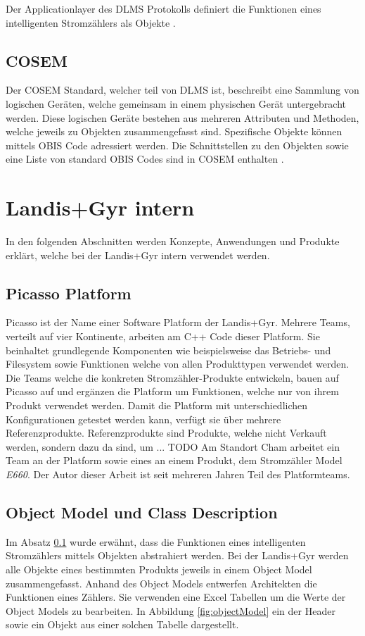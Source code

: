 Der Applicationlayer des \ac{DLMS} Protokolls definiert die Funktionen eines intelligenten Stromzählers als Objekte \parencite{vyas2012advance}.

\subsection{COSEM}\label{cosem}
Der \ac{COSEM} Standard, welcher teil von \ac{DLMS} ist, beschreibt eine Sammlung von logischen Geräten, welche gemeinsam in einem physischen Gerät untergebracht werden.
Diese logischen Geräte bestehen aus mehreren Attributen und Methoden, welche jeweils zu Objekten zusammengefasst sind.
Spezifische Objekte können mittels \ac{OBIS} Code adressiert werden.
Die Schnittstellen zu den Objekten sowie eine Liste von standard \ac{OBIS} Codes sind in \ac{COSEM} enthalten  \parencite{vyas2012advance}.


\section{Landis+Gyr intern}\label{lgintern}
In den folgenden Abschnitten werden Konzepte, Anwendungen und Produkte erklärt, welche bei der Landis+Gyr intern verwendet werden.

\subsection{Picasso Platform}\label{picasso}
Picasso ist der Name einer Software Platform der Landis+Gyr.
Mehrere Teams, verteilt auf vier Kontinente, arbeiten am C++ Code dieser Platform.
Sie beinhaltet grundlegende Komponenten wie beispielsweise das Betriebs- und Filesystem sowie Funktionen welche von allen Produkttypen verwendet werden.
Die Teams welche die konkreten Stromzähler-Produkte entwickeln, bauen auf Picasso auf und ergänzen die Platform um Funktionen, welche nur von ihrem Produkt verwendet werden.
Damit die Platform mit unterschiedlichen Konfigurationen getestet werden kann, verfügt sie über mehrere Referenzprodukte.
Referenzprodukte sind Produkte, welche nicht Verkauft werden, sondern dazu da sind, um ... TODO
Am Standort Cham arbeitet ein Team an der Platform sowie eines an einem Produkt, dem Stromzähler Model \textit{E660}.
Der Autor dieser Arbeit ist seit mehreren Jahren Teil des Platformteams.



\subsection{Object Model und Class Description}\label{objectModelsClassDescriptions}
Im Absatz \ref{cosem} wurde erwähnt, dass die Funktionen eines intelligenten Stromzählers mittels Objekten abstrahiert werden.
Bei der Landis+Gyr werden alle Objekte eines bestimmten Produkts jeweils in einem Object Model zusammengefasst.
Anhand des Object Models entwerfen Architekten die Funktionen eines Zählers.
Sie verwenden eine Excel Tabellen um die Werte der Object Models zu bearbeiten.
In Abbildung \ref{fig:objectModel} ein der Header sowie ein Objekt aus einer solchen Tabelle dargestellt.


